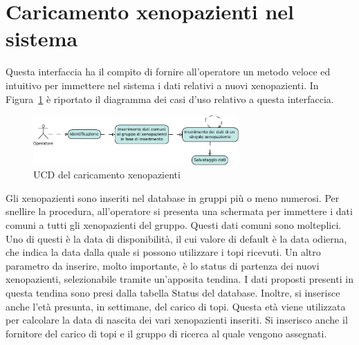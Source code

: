 \section{Caricamento xenopazienti nel sistema}

Questa interfaccia ha il compito di fornire all'operatore un metodo veloce ed intuitivo per immettere nel sistema i dati relativi a nuovi xenopazienti. In Figura~\ref{fig:UCDmiceL} \`e riportato il diagramma dei casi d'uso relativo a questa interfaccia.

\begin{figure}[h]
\begin{center}
\includegraphics[width=0.7\textwidth]{./Figure/UCDmiceloading}
\end{center}
\caption{UCD del caricamento xenopazienti\label{fig:UCDmiceL}}
\end{figure}

Gli xenopazienti sono inseriti nel database in gruppi pi\`u o meno numerosi. Per snellire la procedura, all'operatore si presenta una schermata per immettere i dati comuni a tutti gli xenopazienti del gruppo. Questi dati comuni sono molteplici. Uno di questi \`e la data di disponibilit\`a, il cui valore di default \`e la data odierna, che indica la data dalla quale si possono utilizzare i topi ricevuti. Un altro parametro da inserire, molto importante, \`e lo status di partenza dei nuovi xenopazienti, selezionabile tramite un'apposita tendina. I dati proposti presenti in questa tendina sono presi dalla tabella Status del database. Inoltre, si inserisce anche l'et\`a presunta, in settimane, del carico di topi. Questa et\`a viene utilizzata per calcolare la data di nascita dei vari xenopazienti inseriti. Si inserisco anche il fornitore del carico di topi e il gruppo di ricerca al quale vengono assegnati.

